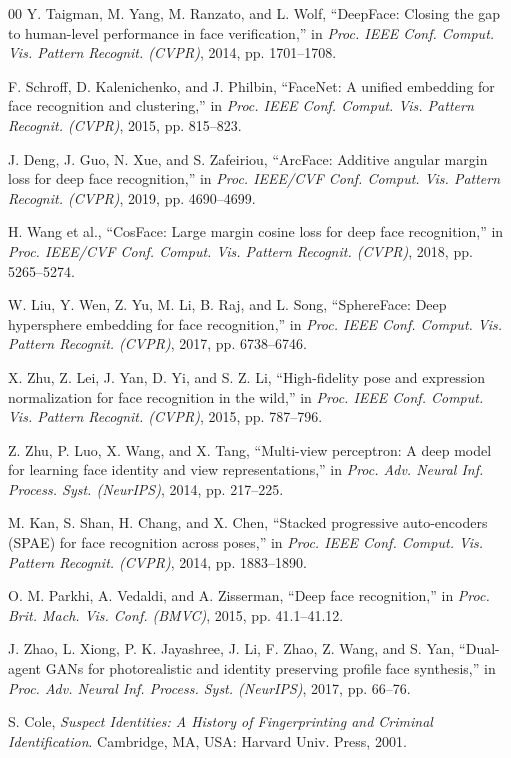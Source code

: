 \documentclass[conference]{IEEEtran}
\begin{document}
\begin{thebibliography}{00}
 Y. Taigman, M. Yang, M. Ranzato, and L. Wolf, ``DeepFace: Closing the gap to human-level performance in face verification,'' in \textit{Proc. IEEE Conf. Comput. Vis. Pattern Recognit. (CVPR)}, 2014, pp. 1701--1708.

 F. Schroff, D. Kalenichenko, and J. Philbin, ``FaceNet: A unified embedding for face recognition and clustering,'' in \textit{Proc. IEEE Conf. Comput. Vis. Pattern Recognit. (CVPR)}, 2015, pp. 815--823.

 J. Deng, J. Guo, N. Xue, and S. Zafeiriou, ``ArcFace: Additive angular margin loss for deep face recognition,'' in \textit{Proc. IEEE/CVF Conf. Comput. Vis. Pattern Recognit. (CVPR)}, 2019, pp. 4690--4699.

 H. Wang et al., ``CosFace: Large margin cosine loss for deep face recognition,'' in \textit{Proc. IEEE/CVF Conf. Comput. Vis. Pattern Recognit. (CVPR)}, 2018, pp. 5265--5274.

 W. Liu, Y. Wen, Z. Yu, M. Li, B. Raj, and L. Song, ``SphereFace: Deep hypersphere embedding for face recognition,'' in \textit{Proc. IEEE Conf. Comput. Vis. Pattern Recognit. (CVPR)}, 2017, pp. 6738--6746.

 X. Zhu, Z. Lei, J. Yan, D. Yi, and S. Z. Li, ``High-fidelity pose and expression normalization for face recognition in the wild,'' in \textit{Proc. IEEE Conf. Comput. Vis. Pattern Recognit. (CVPR)}, 2015, pp. 787--796.

 Z. Zhu, P. Luo, X. Wang, and X. Tang, ``Multi-view perceptron: A deep model for learning face identity and view representations,'' in \textit{Proc. Adv. Neural Inf. Process. Syst. (NeurIPS)}, 2014, pp. 217--225.

 M. Kan, S. Shan, H. Chang, and X. Chen, ``Stacked progressive auto-encoders (SPAE) for face recognition across poses,'' in \textit{Proc. IEEE Conf. Comput. Vis. Pattern Recognit. (CVPR)}, 2014, pp. 1883--1890.

 O. M. Parkhi, A. Vedaldi, and A. Zisserman, ``Deep face recognition,'' in \textit{Proc. Brit. Mach. Vis. Conf. (BMVC)}, 2015, pp. 41.1--41.12.

 J. Zhao, L. Xiong, P. K. Jayashree, J. Li, F. Zhao, Z. Wang, and S. Yan, ``Dual-agent GANs for photorealistic and identity preserving profile face synthesis,'' in \textit{Proc. Adv. Neural Inf. Process. Syst. (NeurIPS)}, 2017, pp. 66--76.

 S. Cole, \textit{Suspect Identities: A History of Fingerprinting and Criminal Identification}. Cambridge, MA, USA: Harvard Univ. Press, 2001.


\end{thebibliography}
\end{document}
